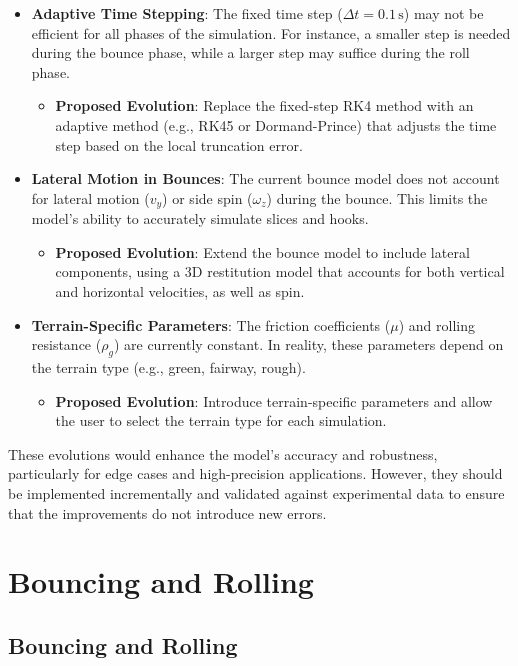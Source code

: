 \documentclass[10pt,a4paper]{report}
\begin{document}
\begin{itemize}
    \item \textbf{Adaptive Time Stepping}:
    The fixed time step (\( \Delta t = 0.1 \, \text{s} \)) may not be efficient for all phases of the simulation. For instance, a smaller step is needed during the bounce phase, while a larger step may suffice during the roll phase.
    \begin{itemize}
        \item \textbf{Proposed Evolution}: Replace the fixed-step RK4 method with an adaptive method (e.g., RK45 or Dormand-Prince) that adjusts the time step based on the local truncation error.
    \end{itemize}

    \item \textbf{Lateral Motion in Bounces}:
    The current bounce model does not account for lateral motion (\( v_y \)) or side spin (\( \omega_z \)) during the bounce. This limits the model's ability to accurately simulate slices and hooks.
    \begin{itemize}
        \item \textbf{Proposed Evolution}: Extend the bounce model to include lateral components, using a 3D restitution model that accounts for both vertical and horizontal velocities, as well as spin.
    \end{itemize}

    \item \textbf{Terrain-Specific Parameters}:
    The friction coefficients (\( \mu \)) and rolling resistance (\( \rho_g \)) are currently constant. In reality, these parameters depend on the terrain type (e.g., green, fairway, rough).
    \begin{itemize}
        \item \textbf{Proposed Evolution}: Introduce terrain-specific parameters and allow the user to select the terrain type for each simulation.
    \end{itemize}
\end{itemize}

These evolutions would enhance the model's accuracy and robustness, particularly for edge cases and high-precision applications. However, they should be implemented incrementally and validated against experimental data to ensure that the improvements do not introduce new errors.


\chapter{Bouncing and Rolling}
\section{Bouncing and Rolling}
\label{sec:bouncing_rolling}
\end{document}
